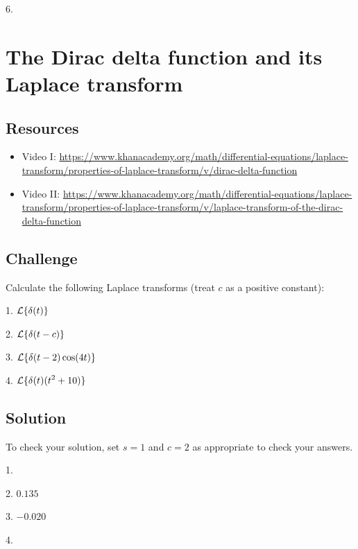 6.\\



\newpage
\section{The Dirac delta function and its Laplace transform}

\subsection*{Resources}
\begin{itemize}
    \item Video I: \url{https://www.khanacademy.org/math/differential-equations/laplace-transform/properties-of-laplace-transform/v/dirac-delta-function}
    \item Video II: \url{https://www.khanacademy.org/math/differential-equations/laplace-transform/properties-of-laplace-transform/v/laplace-transform-of-the-dirac-delta-function}
\end{itemize}

\subsection*{Challenge}
Calculate the following Laplace transforms (treat $c$ as a positive constant):

1. $\displaystyle \mathcal{L}\{\delta(t)\}$

2. $\displaystyle \mathcal{L}\{\delta(t-c)\}$

3. $\displaystyle \mathcal{L}\{\delta(t-2) \cos(4 t)\}$

4. $\displaystyle \mathcal{L}\{\delta(t) (t^2+10)\}$

\subsection*{Solution}
To check your solution, set $s=1$ and $c=2$ as appropriate to check your answers. %

1.\\

2. $0.135$

3. $-0.020$

4.\\




\newpage
